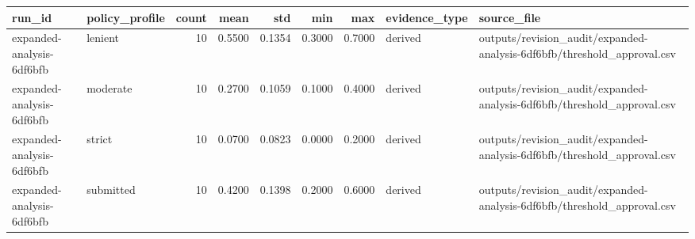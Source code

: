 \begin{tabular}{llrrrrrll}
\toprule
run\_id & policy\_profile & count & mean & std & min & max & evidence\_type & source\_file \\
\midrule
expanded-analysis-6df6bfb & lenient & 10 & 0.5500 & 0.1354 & 0.3000 & 0.7000 & derived & outputs/revision\_audit/expanded-analysis-6df6bfb/threshold\_approval.csv \\
expanded-analysis-6df6bfb & moderate & 10 & 0.2700 & 0.1059 & 0.1000 & 0.4000 & derived & outputs/revision\_audit/expanded-analysis-6df6bfb/threshold\_approval.csv \\
expanded-analysis-6df6bfb & strict & 10 & 0.0700 & 0.0823 & 0.0000 & 0.2000 & derived & outputs/revision\_audit/expanded-analysis-6df6bfb/threshold\_approval.csv \\
expanded-analysis-6df6bfb & submitted & 10 & 0.4200 & 0.1398 & 0.2000 & 0.6000 & derived & outputs/revision\_audit/expanded-analysis-6df6bfb/threshold\_approval.csv \\
\bottomrule
\end{tabular}
